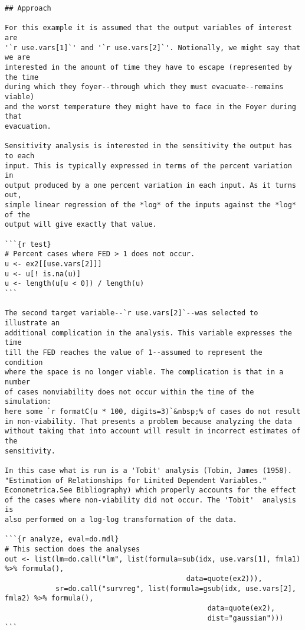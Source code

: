 \begin{lstlisting}[basicstyle=\scriptsize]
## Approach

For this example it is assumed that the output variables of interest are
'`r use.vars[1]`' and '`r use.vars[2]`'. Notionally, we might say that we are
interested in the amount of time they have to escape (represented by the time
during which they foyer--through which they must evacuate--remains viable)
and the worst temperature they might have to face in the Foyer during that
evacuation.

Sensitivity analysis is interested in the sensitivity the output has to each
input. This is typically expressed in terms of the percent variation in
output produced by a one percent variation in each input. As it turns out,
simple linear regression of the *log* of the inputs against the *log* of the
output will give exactly that value.

```{r test}
# Percent cases where FED > 1 does not occur.
u <- ex2[[use.vars[2]]]
u <- u[! is.na(u)]
u <- length(u[u < 0]) / length(u)
```

The second target variable--`r use.vars[2]`--was selected to illustrate an
additional complication in the analysis. This variable expresses the time
till the FED reaches the value of 1--assumed to represent the condition
where the space is no longer viable. The complication is that in a number
of cases nonviability does not occur within the time of the simulation:
here some `r formatC(u * 100, digits=3)`&nbsp;% of cases do not result
in non-viability. That presents a problem because analyzing the data
without taking that into account will result in incorrect estimates of the
sensitivity.

In this case what is run is a 'Tobit' analysis (Tobin, James (1958).
"Estimation of Relationships for Limited Dependent Variables."
Econometrica.See Bibliography) which properly accounts for the effect
of the cases where non-viability did not occur. The 'Tobit'  analysis is
also performed on a log-log transformation of the data.

```{r analyze, eval=do.mdl}
# This section does the analyses
out <- list(lm=do.call("lm", list(formula=sub(idx, use.vars[1], fmla1) %>% formula(),
                                           data=quote(ex2))),
            sr=do.call("survreg", list(formula=gsub(idx, use.vars[2], fmla2) %>% formula(),
                                                data=quote(ex2),
                                                dist="gaussian")))
```


\end{lstlisting}
